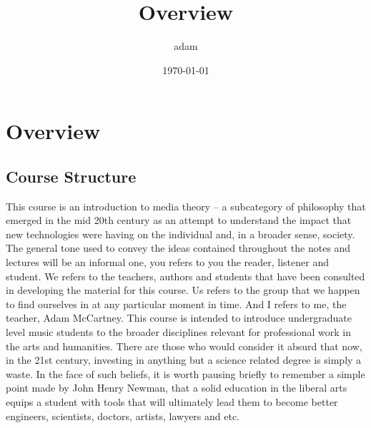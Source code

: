 \documentclass[11pt]{article}
\author{adam}
\date{\today}
\title{Overview}
\begin{document}
\maketitle
\section*{Overview}
\label{sec:org7fe5846}

\subsection*{Course Structure}
\label{sec:org9d466ec}
This course is an introduction to media theory – a subcategory of
philosophy that emerged in the mid 20th century as an attempt to
understand the impact that new technologies were having on the
individual and, in a broader sense, society.
The general tone used to convey the ideas contained throughout the
notes and lectures will be an informal one, you refers to you the
reader, listener and student. We refers to the teachers, authors and
students that have been consulted in developing the material for this
course. Us refers to the group that we happen to find ourselves in at
any particular moment in time. And I refers to me, the teacher, Adam McCartney.
This course is intended to introduce undergraduate level music
students to the broader disciplines relevant for professional work in
the arts and humanities. There are those who would consider it absurd
that now, in the 21st century, investing in anything but a science
related degree is simply a waste. In the face of such beliefs, it is
worth pausing briefly to remember a simple point made by John Henry
Newman, that a solid education in the liberal arts equips a student
with tools that will ultimately lead them to become better engineers,
scientists, doctors, artists, lawyers and etc.
\end{document}
